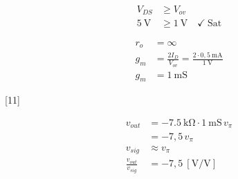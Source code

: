\documentclass[11pt,a4paper]{article}
\begin{document}
\[ \begin{aligned} V_{DS} &\ge V_{ov} \\ \qty{5}{\volt} &\ge 1\ \mathrm{V} \quad \checkmark\ \text{Sat} \end{aligned} \]

\begin{align*}
  r_o &= \infty \\
  g_m &= \frac{2 I_D}{V_{ov}} = \frac{2 \cdot 0{,}5\ \mathrm{mA}}{1\ \mathrm{V}} \\
  g_m &= \qty{1}{\milli\siemens}
\end{align*}

[11]

\begin{align*}
  v_{out} &= -\qty{7,5}{\kilo\ohm} \cdot \qty{1}{\milli\siemens}\, v_\pi \\
          &= -7{,}5\, v_\pi \\
  v_{sig} &\approx v_\pi \\
  \frac{v_{out}}{v_{sig}} &= -7{,}5\ [\mathrm{V/V}]
\end{align*}
\end{document}
